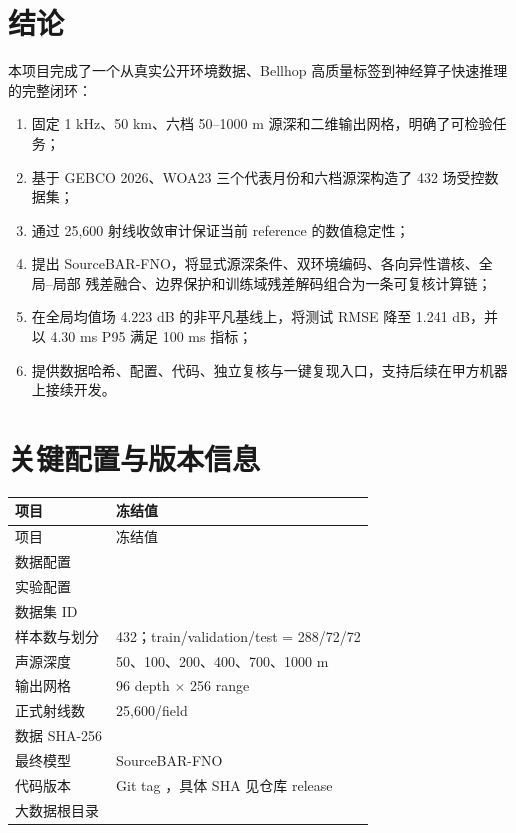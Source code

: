 \documentclass[UTF8,11pt]{ctexart}
\newcommand{\BestModel}{SourceBAR-FNO}
\newcommand{\BestRMSE}{1.241}
\newcommand{\GlobalBaseline}{4.223}
\newcommand{\GpuPninetyfive}{4.30}
\begin{document}
\section{结论}

本项目完成了一个从真实公开环境数据、Bellhop 高质量标签到神经算子快速推理的完整闭环：
\begin{enumerate}
  \item 固定 1 kHz、50 km、六档 50--1000 m 源深和二维输出网格，明确了可检验任务；
  \item 基于 GEBCO 2026、WOA23 三个代表月份和六档源深构造了 432 场受控数据集；
  \item 通过 25,600 射线收敛审计保证当前 reference 的数值稳定性；
  \item 提出 SourceBAR-FNO，将显式源深条件、双环境编码、各向异性谱核、全局--局部
  残差融合、边界保护和训练域残差解码组合为一条可复核计算链；
  \item 在全局均值场 \GlobalBaseline{} dB 的非平凡基线上，将测试 RMSE 降至
  \BestRMSE{} dB，并以 \GpuPninetyfive{} ms P95 满足 100 ms 指标；
  \item 提供数据哈希、配置、代码、独立复核与一键复现入口，支持后续在甲方机器上接续开发。
\end{enumerate}

\appendix
\section{关键配置与版本信息}

\begin{longtable}{L{4.4cm}L{9.6cm}}
\toprule
项目 & 冻结值 \\
\midrule
\endfirsthead
\toprule
项目 & 冻结值 \\
\midrule
\endhead
数据配置 &  \\
实验配置 &  \\
数据集 ID &  \\
样本数与划分 & 432；train/validation/test = 288/72/72 \\
声源深度 & 50、100、200、400、700、1000 m \\
输出网格 & 96 depth $\times$ 256 range \\
正式射线数 & 25,600/field \\
数据 SHA-256 &  \\
最终模型 & \BestModel \\
代码版本 & Git tag ，具体 SHA 见仓库 release \\
大数据根目录 &  \\
\bottomrule
\end{longtable}
\end{document}
